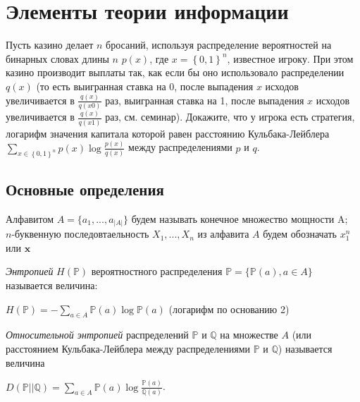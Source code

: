 \section{Элементы теории информации}

\begin{problem}

Пусть казино делает $n$ бросаний, используя распределение вероятностей на бинарных словах длины $n$ $p\left(x\right)$, где $x=\left\{0,1\right\}^{n} $, известное игроку. При этом казино производит выплаты так, как если бы оно использовало распределении $q\left(x\right)$ (то есть выигранная ставка на 0, после выпадения $x$ исходов увеличивается в $\frac{q\left(x\right)}{q\left(x0\right)} $ раз, выигранная ставка на 1, после выпадения $x$ исходов увеличивается в $\frac{q\left(x\right)}{q\left(x1\right)} $ раз, см. семинар). Докажите, что у игрока есть стратегия, логарифм значения капитала которой равен расстоянию Кульбака-Лейблера $\sum _{x\in \left\{0,1\right\}^{n} }p\left(x\right)\log \frac{p\left(x\right)}{q\left(x\right)}  $ между распределениями $p$ и $q$.
\end{problem}


\subsection{Основные определения}
Алфавитом $A = \{a_1, ..., a_{|A|}\}$ будем называть конечное множество мощности A;\\
$n$-буквенную последовтаельность $X_1, ..., X_n$ из алфавита $A$ будем обозначать $x_1^n$ или $\textbf{x}$


\begin{definition} 
\textit{Энтропией} $H(\mathbb{P})$ вероятностного распределения $\mathbb{P} = \{\mathbb{P}(a), a \in A\}$ называется величина:
\begin{center}
$H(\mathbb{P}) = - \sum_{a \in A} \mathbb{P}(a)\log \mathbb{P}(a)$ (логарифм по основанию 2)
\end{center}
\end{definition}

\begin{definition}
\textit{Относительной энтропией} распределений $\mathbb{P}$ и $\mathbb{Q}$ на множестве $A$ (или расстоянием Кульбака-Лейблера между распределениями $\mathbb{P}$ и $\mathbb{Q}$) называется величина
\begin{center}
$D(\mathbb{P}||\mathbb{Q}) = \sum_{a \in A} \mathbb{P}(a) \log \frac{\mathbb{P}(a)}{\mathbb{Q}(a)}$.
\end{center}

\end{definition}


